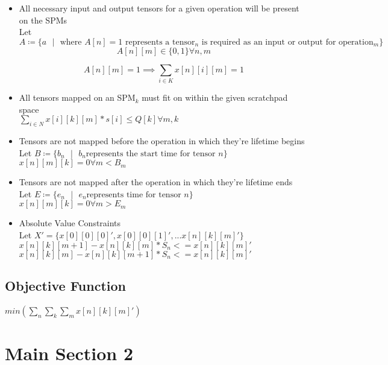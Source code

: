 \begin{itemize}
	\item All necessary input and output tensors for a given operation will be present on the SPMs\\

		Let $A \coloneqq \{ a \text{ } | \text{ } \text{where } A[n] = 1\text{ represents a tensor$_n$ is required as an input or output for operation$_m$} \}$\\
		\[
			A[n][m] \in \{0, 1\} \forall n,m
		\]

		\[
			A[n][m] = 1 \implies \sum_{i \in K} x[n][i][m] = 1 
		\]

	\item All tensors mapped on an SPM$_k$ must fit on within the given scratchpad space\\

		$\sum_{i \in N} {x[i][k][m] * s[i]} \leq Q[k] \forall m,k$\\

	\item Tensors are not mapped before the operation in which they're lifetime begins \\

		Let $B \coloneqq \{ b_n \text{ } | \text{ }  b_n \text{represents the start time for tensor $n$}\}$ \\

		$x[n][m][k] = 0 \forall m < B_m$

	\item Tensors are not mapped after the operation in which they're lifetime ends \\

		Let $E \coloneqq \{ e_n \text{ } | \text{ }  e_n \text{represents time for tensor $n$}\}$ \\

		$x[n][m][k]= 0 \forall m > E_m$

	\item Absolute Value Constraints\\
		Let $X\prime = \{ x[0][0][0]\prime, x[0][0][1]\prime, ... x[n][k][m]\prime\}$\\
		$x[n][k][m+1] - x[n][k][m] * S_n <= x[n][k][m]\prime$\\
		$x[n][k][m] - x[n][k][m + 1] * S_n <= x[n][k][m]\prime$\\

\end{itemize}


\subsection{Objective Function}

$min(\sum_n \sum_k \sum_m x[n][k][m]\prime)$



\section{Main Section 2}


